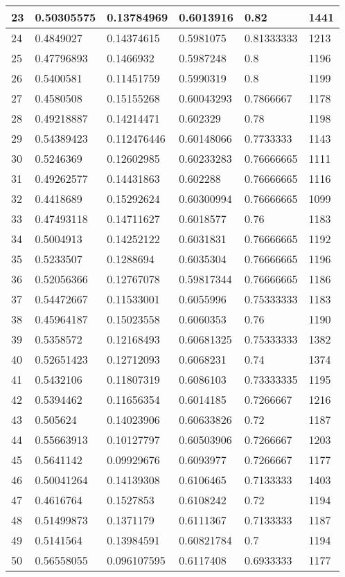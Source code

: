 \begin{longtable}{|l|l|l|l|l|l|}
23 & 0.50305575 & 0.13784969 & 0.6013916 & 0.82 & 1441 \\ \hline 
24 & 0.4849027 & 0.14374615 & 0.5981075 & 0.81333333 & 1213 \\ \hline 
25 & 0.47796893 & 0.1466932 & 0.5987248 & 0.8 & 1196 \\ \hline 
26 & 0.5400581 & 0.11451759 & 0.5990319 & 0.8 & 1199 \\ \hline 
27 & 0.4580508 & 0.15155268 & 0.60043293 & 0.7866667 & 1178 \\ \hline 
28 & 0.49218887 & 0.14214471 & 0.602329 & 0.78 & 1198 \\ \hline 
29 & 0.54389423 & 0.112476446 & 0.60148066 & 0.7733333 & 1143 \\ \hline 
30 & 0.5246369 & 0.12602985 & 0.60233283 & 0.76666665 & 1111 \\ \hline 
31 & 0.49262577 & 0.14431863 & 0.602288 & 0.76666665 & 1116 \\ \hline 
32 & 0.4418689 & 0.15292624 & 0.60300994 & 0.76666665 & 1099 \\ \hline 
33 & 0.47493118 & 0.14711627 & 0.6018577 & 0.76 & 1183 \\ \hline 
34 & 0.5004913 & 0.14252122 & 0.6031831 & 0.76666665 & 1192 \\ \hline 
35 & 0.5233507 & 0.1288694 & 0.6035304 & 0.76666665 & 1196 \\ \hline 
36 & 0.52056366 & 0.12767078 & 0.59817344 & 0.76666665 & 1186 \\ \hline 
37 & 0.54472667 & 0.11533001 & 0.6055996 & 0.75333333 & 1183 \\ \hline 
38 & 0.45964187 & 0.15023558 & 0.6060353 & 0.76 & 1190 \\ \hline 
39 & 0.5358572 & 0.12168493 & 0.60681325 & 0.75333333 & 1382 \\ \hline 
40 & 0.52651423 & 0.12712093 & 0.6068231 & 0.74 & 1374 \\ \hline 
41 & 0.5432106 & 0.11807319 & 0.6086103 & 0.73333335 & 1195 \\ \hline 
42 & 0.5394462 & 0.11656354 & 0.6014185 & 0.7266667 & 1216 \\ \hline 
43 & 0.505624 & 0.14023906 & 0.60633826 & 0.72 & 1187 \\ \hline 
44 & 0.55663913 & 0.10127797 & 0.60503906 & 0.7266667 & 1203 \\ \hline 
45 & 0.5641142 & 0.09929676 & 0.6093977 & 0.7266667 & 1177 \\ \hline 
46 & 0.50041264 & 0.14139308 & 0.6106465 & 0.7133333 & 1403 \\ \hline 
47 & 0.4616764 & 0.1527853 & 0.6108242 & 0.72 & 1194 \\ \hline 
48 & 0.51499873 & 0.1371179 & 0.6111367 & 0.7133333 & 1187 \\ \hline 
49 & 0.5141564 & 0.13984591 & 0.60821784 & 0.7 & 1194 \\ \hline 
50 & 0.56558055 & 0.096107595 & 0.6117408 & 0.6933333 & 1177 \\ \hline 
\end{longtable}